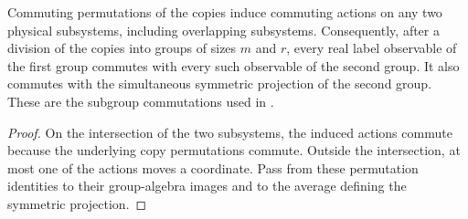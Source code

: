 \begin{theorem}
\label{thm:grouped_copy_label_commutation}
\leanok
Commuting permutations of the copies induce commuting actions on
any two physical subsystems, including overlapping subsystems.
Consequently, after a division of the copies into groups of sizes
$m$ and $r$, every real label observable of the first group commutes
with every such observable of the second group. It also commutes
with the simultaneous symmetric projection of the second group.
These are the subgroup commutations used in
\cite[Section~8, lines 454--480]{OpenAI2026AreaLaw}.
\end{theorem}
\begin{proof}\leanok
On the intersection of the two subsystems, the induced actions
commute because the underlying copy permutations commute. Outside
the intersection, at most one of the actions moves a coordinate.
Pass from these permutation identities to their group-algebra
images and to the average defining the symmetric projection.
\end{proof}
